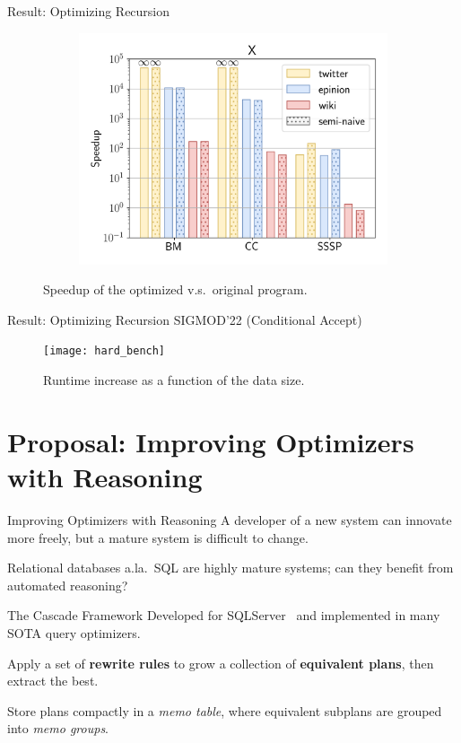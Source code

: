 \documentclass{beamer}
\begin{document}
\begin{frame}{Result: Optimizing Recursion}
\begin{figure}
      \begin{subfigure}[b]{0.4\textwidth}
        \centering
        \includegraphics[width=\textwidth]{basic-x}
      \end{subfigure}
      \caption*{Speedup of the optimized v.s.\ original program.}
    \end{figure}    
  \end{frame}

  \begin{frame}{Result: Optimizing Recursion}
    SIGMOD'22 (Conditional Accept)
    \begin{figure}
      \centering
      \texttt{[image: hard\_bench]}
      \caption*{Runtime increase as a function of the data size.}
  \end{figure} 
  \end{frame}

  \section{Proposal: Improving Optimizers with Reasoning}

  \begin{frame}{Improving Optimizers with Reasoning}
    A developer of a new system can innovate more freely, 
    but a mature system is difficult to change.

    Relational databases a.la.~SQL are highly mature systems; 
    can they benefit from automated reasoning? 
  \end{frame}

  \begin{frame}{The Cascade Framework}
    Developed for SQLServer~\cite{cascades} and implemented in 
    many SOTA query optimizers. \pause

    Apply a set of \textbf{rewrite rules} to grow a collection 
    of \textbf{equivalent plans}, then extract the best. \pause

    Store plans compactly in a {\em memo table}, where equivalent 
    subplans are grouped into {\em memo groups}.
  \end{frame}
\end{document}
